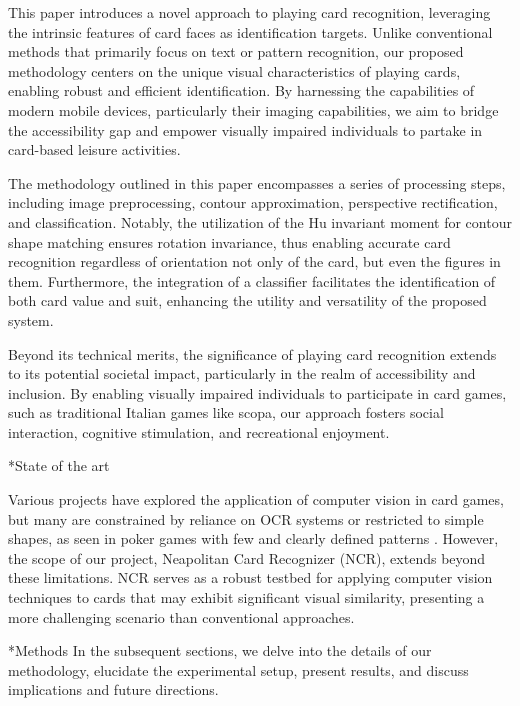 \documentclass[twocolumn, a4paper,10pt]{article}
\makeatletter
\renewcommand\section{\@startsection{section}{1}{\z@}{3pt}{3pt}{\normalfont\large\bfseries}}
\renewcommand\subsection{\@startsection{subsection}{1}{\z@}{\z@}{\z@}{\normalfont\normalsize\bfseries}}
\renewcommand\subsection{\@startsection{subsection}{1}{\z@}{\z@}{0.1pt}{\normalfont\normalsize\bfseries}}
\makeatother
\begin{document}
This paper introduces a novel approach to playing card recognition, leveraging the intrinsic features of card faces as identification targets. Unlike conventional methods that primarily focus on text or pattern recognition, our proposed methodology centers on the unique visual characteristics of playing cards, enabling robust and efficient identification. By harnessing the capabilities of modern mobile devices, particularly their imaging capabilities, we aim to bridge the accessibility gap and empower visually impaired individuals to partake in card-based leisure activities.

The methodology outlined in this paper encompasses a series of processing steps, including image preprocessing, contour approximation, perspective rectification, and classification. Notably, the utilization of the Hu invariant moment for contour shape matching ensures rotation invariance, thus enabling accurate card recognition regardless of orientation not only of the card, but even the figures in them. Furthermore, the integration of a classifier facilitates the identification of both card value and suit, enhancing the utility and versatility of the proposed system.

Beyond its technical merits, the significance of playing card recognition extends to its potential societal impact, particularly in the realm of accessibility and inclusion. By enabling visually impaired individuals to participate in card games, such as traditional Italian games like scopa, our approach fosters social interaction, cognitive stimulation, and recreational enjoyment.

\subsection*{State of the art}

Various projects have explored the application of computer vision in card games, but many are constrained by reliance on OCR systems \cite{7972274} or restricted to simple shapes, as seen in poker games with few and clearly defined patterns \cite{9563607}. However, the scope of our project, Neapolitan Card Recognizer (NCR), extends beyond these limitations. NCR serves as a robust testbed for applying computer vision techniques to cards that may exhibit significant visual similarity, presenting a more challenging scenario than conventional approaches.

\section*{Methods}
In the subsequent sections, we delve into the details of our methodology, elucidate the experimental setup, present results, and discuss implications and future directions.
\end{document}
